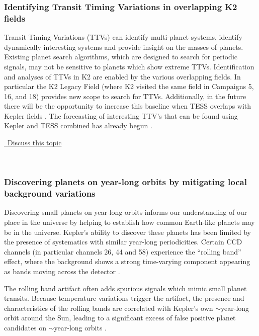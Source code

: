 \documentclass[modern]{aastex62}
\newcommand{\commentlink}[1]{\href{https://github.com/KeplerGO/ScientificOpportunities/issues/#1}{\sc \faExternalLink\ Discuss this topic}\,\,}
\begin{document}
\subsubsection{Identifying Transit Timing Variations in overlapping K2 fields}
Transit Timing Variations (TTVs) can identify multi-planet systems, identify dynamically interesting systems and provide insight on the masses of planets.  Existing planet search algorithms, which are designed to search for periodic signals, may not be sensitive to planets which show extreme TTVs. Identification and analyses of TTVs in K2 are enabled by the various overlapping fields. In particular the K2 Legacy Field (where K2 visited the same field in Campaigns 5, 16, and 18) provides new scope to search for TTVs. Additionally, in the future there will be the opportunity to increase this baseline when TESS overlaps with Kepler fields \citep[e.g. see][]{barclay2018}. The forecasting of interesting TTV's that can be found using Kepler and TESS combined has already begun \citep[e.g.][]{goldberg2018, callista2018}.
\\
\begin{center}
\commentlink{9}
\end{center}
\ \\

\subsubsection{Discovering planets on year-long orbits by mitigating local background variations} \label{sec:oneYearOrbits}
Discovering small planets on year-long orbits informs our understanding of our place in the universe by helping to establish how common Earth-like planets may be in the universe. Kepler's ability to discover these planets has been limited by the presence of systematics with similar year-long periodicities. Certain CCD channels (in particular channels 26, 44 and 58) experience the “rolling band” effect, where the background shows a strong time-varying component appearing as bands moving across the detector \citep[see \S6.7 of][]{vancleve2016}.

The rolling band artifact often adds spurious signals which mimic small planet transits. Because temperature variations trigger the artifact, the presence and characteristics of the rolling bands are correlated with Kepler's own $\sim$year-long orbit around the Sun, leading to a significant excess of false positive planet candidates on $\sim$year-long orbits \citep{thompson2018}.
\end{document}
